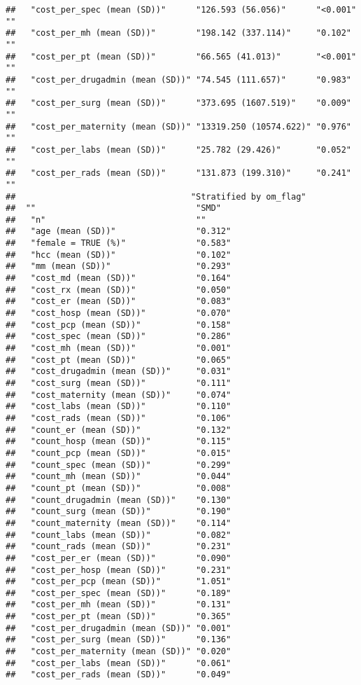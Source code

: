 \documentclass[]{article}
\begin{document}
\begin{verbatim}
##   "cost_per_spec (mean (SD))"      "126.593 (56.056)"      "<0.001" ""    
##   "cost_per_mh (mean (SD))"        "198.142 (337.114)"     "0.102"  ""    
##   "cost_per_pt (mean (SD))"        "66.565 (41.013)"       "<0.001" ""    
##   "cost_per_drugadmin (mean (SD))" "74.545 (111.657)"      "0.983"  ""    
##   "cost_per_surg (mean (SD))"      "373.695 (1607.519)"    "0.009"  ""    
##   "cost_per_maternity (mean (SD))" "13319.250 (10574.622)" "0.976"  ""    
##   "cost_per_labs (mean (SD))"      "25.782 (29.426)"       "0.052"  ""    
##   "cost_per_rads (mean (SD))"      "131.873 (199.310)"     "0.241"  ""    
##                                   "Stratified by om_flag"
##  ""                                "SMD"  
##   "n"                              ""     
##   "age (mean (SD))"                "0.312"
##   "female = TRUE (%)"              "0.583"
##   "hcc (mean (SD))"                "0.102"
##   "mm (mean (SD))"                 "0.293"
##   "cost_md (mean (SD))"            "0.164"
##   "cost_rx (mean (SD))"            "0.050"
##   "cost_er (mean (SD))"            "0.083"
##   "cost_hosp (mean (SD))"          "0.070"
##   "cost_pcp (mean (SD))"           "0.158"
##   "cost_spec (mean (SD))"          "0.286"
##   "cost_mh (mean (SD))"            "0.001"
##   "cost_pt (mean (SD))"            "0.065"
##   "cost_drugadmin (mean (SD))"     "0.031"
##   "cost_surg (mean (SD))"          "0.111"
##   "cost_maternity (mean (SD))"     "0.074"
##   "cost_labs (mean (SD))"          "0.110"
##   "cost_rads (mean (SD))"          "0.106"
##   "count_er (mean (SD))"           "0.132"
##   "count_hosp (mean (SD))"         "0.115"
##   "count_pcp (mean (SD))"          "0.015"
##   "count_spec (mean (SD))"         "0.299"
##   "count_mh (mean (SD))"           "0.044"
##   "count_pt (mean (SD))"           "0.008"
##   "count_drugadmin (mean (SD))"    "0.130"
##   "count_surg (mean (SD))"         "0.190"
##   "count_maternity (mean (SD))"    "0.114"
##   "count_labs (mean (SD))"         "0.082"
##   "count_rads (mean (SD))"         "0.231"
##   "cost_per_er (mean (SD))"        "0.090"
##   "cost_per_hosp (mean (SD))"      "0.231"
##   "cost_per_pcp (mean (SD))"       "1.051"
##   "cost_per_spec (mean (SD))"      "0.189"
##   "cost_per_mh (mean (SD))"        "0.131"
##   "cost_per_pt (mean (SD))"        "0.365"
##   "cost_per_drugadmin (mean (SD))" "0.001"
##   "cost_per_surg (mean (SD))"      "0.136"
##   "cost_per_maternity (mean (SD))" "0.020"
##   "cost_per_labs (mean (SD))"      "0.061"
##   "cost_per_rads (mean (SD))"      "0.049"
\end{verbatim}
\end{document}

